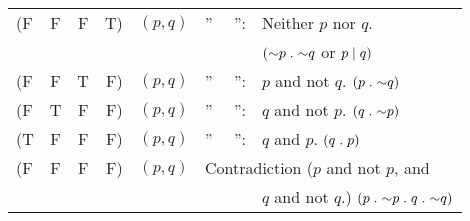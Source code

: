 {\begin{scriptsize}
\begin{tabular}{@{}l@{} @{}c@{} @{}c@{} @{}r@{} @{\thinspace}l@{~} @{~}l@{} @{~}l@{}}
\vspace*{0pt}(F&F&F&T) & $(p,q)$ & \phantom{i}'' \quad~~''\quad: &Neither $p$ nor $q$. \\
\vspace*{0pt}  & & &   &         &                            & \qquad$(\mathord{\sim} p \mathrel{.} \mathord{\sim} q$ or $p \mathrel{\vert} q)$\\
\vspace*{0pt}(F&F&T&F) & $(p,q)$ & \phantom{i}'' \quad~~''\quad: &$p$ and not $q$. \quad$(p \mathrel{.} \mathord{\sim} q)$ \\
\vspace*{0pt}(F&T&F&F) & $(p,q)$ & \phantom{i}'' \quad~~''\quad: &$q$ and not $p$. \quad$(q \mathrel{.} \mathord{\sim} p)$ \\
\vspace*{0pt}(T&F&F&F) & $(p,q)$ & \phantom{i}'' \quad~~''\quad: &$q$ and $p$. \quad$(q \mathrel{.} p)$ \\
\vspace*{0pt}(F&F&F&F) & $(p,q)$ &\multicolumn{2}{l}{\hspace*{-7pt}Contradiction ($p$ and not $p$, and} \\
\vspace*{0pt}  & & &   &         &                            & $q$ and not $q$.) \quad$(p \mathrel{.} \mathord{\sim} p \mathrel{.} q \mathrel{.} \mathord{\sim} q)$ \\
\end{tabular}\end{scriptsize}}
%
\newcommand{\sixzerotwostackonegerman}{\[ \begin{aligned}     &x = \omop[0] x \text{ Def.\ und} \\
     &\omop \omop[\nu] x = \omop[\nu + 1] x \text{ Def.} \end{aligned} \]}
\newcommand{\sixzerotwostackoneogden}{\[ \begin{aligned}     &x = \omop[0] x \text{ Def.\ and} \\
     &\omop \omop[\nu] x = \omop[\nu + 1] x \text{ Def.} \end{aligned} \]}
\newcommand{\sixzerotwostackonepmc}{\[ \begin{aligned}     &x = \omop[0] x \text{ Def.} \\
     &\omop \omop[\nu] x = \omop[\nu + 1] x \text{ Def.} \end{aligned} \]}
%
\newcommand{\sixzerotwostacktwogerman}{\[\begin{aligned} &0+1=1 \text{ Def.}\\
                   &0+1+1=2 \text{ Def.}\\
                   &0+1+1+1=3 \text{ Def.}\\
                   &\text{(u.\,s.\,f.)} 
    \end{aligned}\]}
